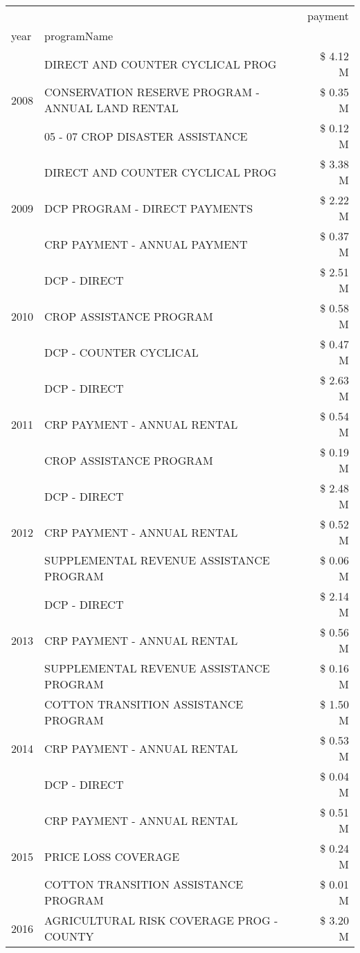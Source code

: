 \begin{tabular}{llr}
\toprule
 &  & payment \\
year & programName &  \\
\midrule
\multirow[t]{3}{*}{2008} & DIRECT AND COUNTER CYCLICAL PROG & \$ 4.12 M \\
 & CONSERVATION RESERVE PROGRAM - ANNUAL LAND RENTAL & \$ 0.35 M \\
 & 05 - 07 CROP DISASTER ASSISTANCE & \$ 0.12 M \\
\cline{1-3}
\multirow[t]{3}{*}{2009} & DIRECT AND COUNTER CYCLICAL PROG & \$ 3.38 M \\
 & DCP PROGRAM - DIRECT PAYMENTS & \$ 2.22 M \\
 & CRP PAYMENT - ANNUAL PAYMENT & \$ 0.37 M \\
\cline{1-3}
\multirow[t]{3}{*}{2010} & DCP - DIRECT & \$ 2.51 M \\
 & CROP ASSISTANCE PROGRAM & \$ 0.58 M \\
 & DCP - COUNTER CYCLICAL & \$ 0.47 M \\
\cline{1-3}
\multirow[t]{3}{*}{2011} & DCP - DIRECT & \$ 2.63 M \\
 & CRP PAYMENT - ANNUAL RENTAL & \$ 0.54 M \\
 & CROP ASSISTANCE PROGRAM & \$ 0.19 M \\
\cline{1-3}
\multirow[t]{3}{*}{2012} & DCP - DIRECT & \$ 2.48 M \\
 & CRP PAYMENT - ANNUAL RENTAL & \$ 0.52 M \\
 & SUPPLEMENTAL REVENUE ASSISTANCE PROGRAM & \$ 0.06 M \\
\cline{1-3}
\multirow[t]{3}{*}{2013} & DCP - DIRECT & \$ 2.14 M \\
 & CRP PAYMENT - ANNUAL RENTAL & \$ 0.56 M \\
 & SUPPLEMENTAL REVENUE ASSISTANCE PROGRAM & \$ 0.16 M \\
\cline{1-3}
\multirow[t]{3}{*}{2014} & COTTON TRANSITION ASSISTANCE PROGRAM & \$ 1.50 M \\
 & CRP PAYMENT - ANNUAL RENTAL & \$ 0.53 M \\
 & DCP - DIRECT & \$ 0.04 M \\
\cline{1-3}
\multirow[t]{3}{*}{2015} & CRP PAYMENT - ANNUAL RENTAL & \$ 0.51 M \\
 & PRICE LOSS COVERAGE & \$ 0.24 M \\
 & COTTON TRANSITION ASSISTANCE PROGRAM & \$ 0.01 M \\
\cline{1-3}
\multirow[t]{3}{*}{2016} & AGRICULTURAL RISK COVERAGE PROG - COUNTY & \$ 3.20 M \\

\end{tabular}
